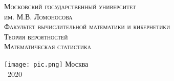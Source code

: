 \begin{titlepage}
    \centering
    \vfill
    {\scshape\large
        Московский государственный университет\\
        им. М.В. Ломоносова\\
        Факультет вычислительной математики и кибернетики\\
   }
    \vskip1cm
    {\scshape\huge
        Теория вероятностей\\
        Математическая статистика\\
   }

    \vfill
    \texttt{[image: pic.png]}
    \vfill
    {\upshape\large
        Москва\\
        ~2020
   }
\end{titlepage}
